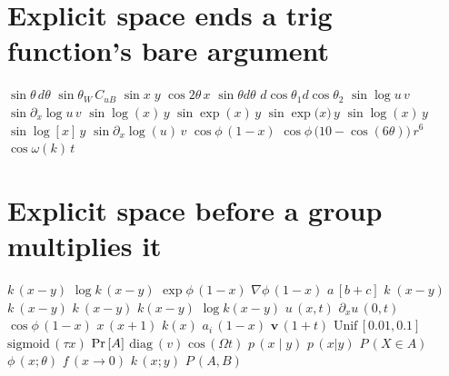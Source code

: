 \documentclass{article}
\begin{document}
\section{Explicit space ends a trig function's bare argument}
$\sin\theta\,d\theta$ $\sin\theta_W\,C_{uB}$ $\sin x\;y$ $\cos 2\theta\,x$ $\sin\theta d\theta$
$d\cos\theta_1 d\cos\theta_2$
$\sin\log u\,v$ $\sin\partial_x\log u\,v$
$\sin\log(x)\,y$ $\sin\exp(x)\,y$ $\sin\exp\bigl(x\bigr)\,y$ $\sin\log\left(x\right)\,y$ $\sin\log[x]\,y$ $\sin\partial_x\log(u)\,v$
$\cos\phi\,(1-x)$ $\cos\phi\,\bigl(10-\cos(6\theta)\bigr)\,r^{6}$ $\cos\omega(k)\,t$
\section{Explicit space before a group multiplies it}
$k\,(x-y)$ $\log k\,(x-y)$ $\exp\phi\,(1-x)$ $\nabla\phi\,(1-x)$ $a\,[b+c]$ $k\;(x-y)$ $k\ (x-y)$ $k~(x-y)$
$k(x-y)$ $\log k(x-y)$ $u\,(x,t)$ $\partial_x u\,(0,t)$ $\cos\phi\,(1-x)$ $x\,(x+1)$ $k\!(x)$
$a_i\,(1-x)$ $\mathbf{v}\,(1+t)$ $\mathrm{Unif}\,[0.01,0.1]$ $\mathrm{sigmoid}\,(\tau x)$ ${\rm Pr}\,[A]$ $\mathrm{diag}\ (v)$ $\mathrm{cos}\,(\Omega t)$
$p\,(x\mid y)$ $p\,(x|y)$ $P\,(X\in A)$ $\phi\,(x;\theta)$ $f\,(x\to 0)$ $k\,(x;y)$ $P\,(A,B)$
\end{document}
